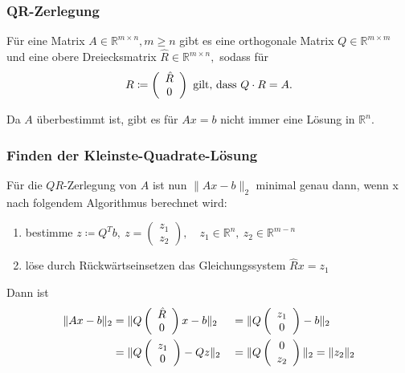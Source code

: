\documentclass[a4paper, 11pt]{beamer}
\begin{document}
\begin{frame}
    \frametitle{QR-Zerlegung}
    Für eine Matrix $A \in \mathbb{R}^{m \times n}, m \geq n$ gibt es eine orthogonale Matrix $Q \in \mathbb{R}^{m \times m}$ und eine obere Dreiecksmatrix $\hat{R} \in \mathbb{R}^{m \times n},$ sodass für
    $$ R \coloneqq \left( \begin{array}{c} \hat{R}\\ 0 \end{array} \right) \text{ gilt, dass } Q \cdot R = A. $$

    Da $A$ überbestimmt ist, gibt es für $Ax = b$ nicht immer eine Lösung in $\mathbb{R}^n.$\\
    \vspace{0.40cm}
\end{frame}

\begin{frame}
    \frametitle{Finden der Kleinste-Quadrate-Lösung}

    Für die $QR$-Zerlegung von $A$ ist nun $\| Ax-b \|_2$ minimal genau dann, wenn x nach folgendem Algorithmus berechnet wird:

    \begin{enumerate}
        \item bestimme $z \coloneqq Q^T b,\ z = \left( \begin{array}{r} z_1 \\ z_2 \end{array} \right), \quad z_1 \in \mathbb{R}^n,\ z_2 \in \mathbb{R}^{m-n}$
        \item löse durch Rückwärtseinsetzen das Gleichungssystem $\hat{R}x = z_1$
    \end{enumerate}

    \newcommand{\zo}{\left( \begin{array}{c} z_1\\0 \end{array} \right)}
    \newcommand{\zO}{\left( \begin{array}{c} 0\\z_2 \end{array} \right)}

    Dann ist \begin{alignat*}{2}
        \| Ax-b \|_2 &= \| Q\R x-b \|_2 &&= \| Q \zo - b\|_2 \\
        &= \| Q \zo - Q z \|_2 &&= \| Q \zO \|_2 = \| z_2 \|_2
    \end{alignat*}
    
\end{frame}
\end{document}

